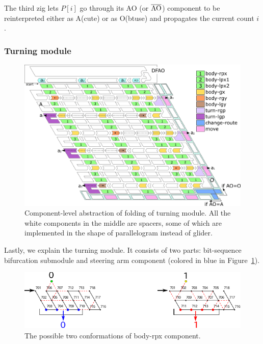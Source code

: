 \documentclass{article}
\theoremstyle{remark}
\begin{document}
The third zig lets $P[i]$ go through its AO (or $\overline{\rm AO}$) component to be reinterpreted either as A(cute) or as O(btuse) and propagates the current count $i$.   

			\subsubsection{Turning module}

\begin{figure}[t]
\centering
\includegraphics[width=\linewidth]{overall_turn_part.pdf}
\caption{
Component-level abstraction of folding of turning module.
All the white components in the middle are spacers, some of which are implemented in the shape of parallelogram instead of glider. 
 }
\label{fig:overall_turning}
\end{figure}

Lastly, we explain the turning module. 
It consists of two parts: bit-sequence bifurcation submodule and steering arm component (colored in blue in Figure~\ref{fig:overall_turning}). 

\begin{figure}[h]
\centering
\includegraphics[width=0.8\linewidth]{body-rpx.pdf}
\caption{The possible two conformations of body-rpx component.}
\label{fig:body-rpx}
\end{figure}
\end{document}
